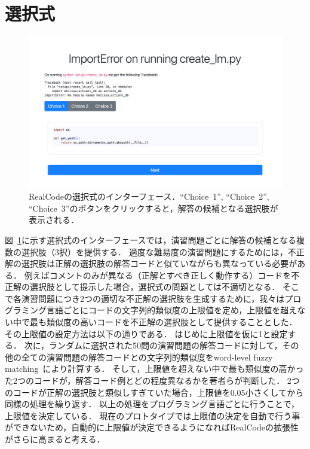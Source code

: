 

\section{選択式}
\begin{figure}[t]
	\centering
  \includegraphics[width=1.0\columnwidth]{20181228-interface-mcq.png}
  \caption{RealCodeの選択式のインターフェース．``Choice~1'', ``Choice~2'', ``Choice~3''のボタンをクリックすると，解答の候補となる選択肢が表示される．}
  \label{fig:mcq}
\end{figure}

図~\ref{fig:mcq}に示す選択式のインターフェースでは，演習問題ごとに解答の候補となる複数の選択肢（3択）を提供する．
適度な難易度の演習問題にするためには，不正解の選択肢は正解の選択肢の解答コードと似ていながらも異なっている必要がある．
例えばコメントのみが異なる（正解とすべき正しく動作する）コードを不正解の選択肢として提示した場合，選択式の問題としては不適切となる．
そこで各演習問題につき2つの適切な不正解の選択肢を生成するために，我々はプログラミング言語ごとにコードの文字列的類似度の上限値を定め，上限値を超えない中で最も類似度の高いコードを不正解の選択肢として提供することとした．
その上限値の設定方法は以下の通りである．
はじめに上限値を仮に1と設定する．
次に，ランダムに選択された50問の演習問題の解答コードに対して，その他の全ての演習問題の解答コードとの文字列的類似度をword-level fuzzy matching~\cite{sankoff1983time}により計算する．
そして，上限値を超えない中で最も類似度の高かった2つのコードが，解答コード例とどの程度異なるかを著者らが判断した．
2つのコードが正解の選択肢と類似しすぎていた場合，上限値を0.05小さくしてから同様の処理を繰り返す．
以上の処理をプログラミング言語ごとに行うことで，上限値を決定している．
現在のプロトタイプでは上限値の決定を自動で行う事ができないため，自動的に上限値が決定できるようになればRealCodeの拡張性がさらに高まると考える．



